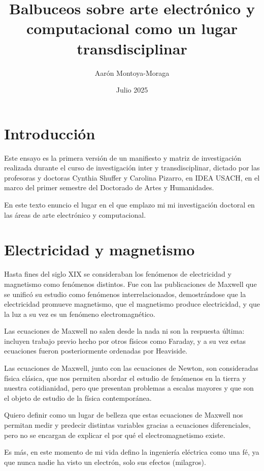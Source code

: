 \documentclass{article}
\title{Balbuceos sobre arte electrónico y computacional como un lugar transdisciplinar}
\author{Aarón Montoya-Moraga}
\date{Julio 2025}
\begin{document}
\maketitle

\renewcommand*\contentsname{Tabla de contenidos}

\tableofcontents

\section{Introducción}

Este ensayo es la primera versión de un manifiesto y matriz de investigación realizada durante el curso de investigación inter y transdisciplinar, dictado por las profesoras y doctoras Cynthia Shuffer y Carolina Pizarro, en IDEA USACH, en el marco del primer semestre del Doctorado de Artes y Humanidades.

En este texto enuncio el lugar en el que emplazo mi mi investigación doctoral en las áreas de arte electrónico y computacional.

\section{Electricidad y magnetismo}

Hasta fines del siglo XIX se consideraban los fenómenos de electricidad y magnetismo como fenómenos distintos. Fue con las publicaciones de Maxwell que se unificó su estudio como fenómenos interrelacionados, demostrándose que la electricidad promueve magnetismo, que el magnetismo produce electricidad, y que la luz a su vez es un fenómeno electromagnético.

Las ecuaciones de Maxwell no salen desde la nada ni son la respuesta última: incluyen trabajo previo hecho por otros físicos como Faraday, y a su vez estas ecuaciones fueron posteriormente ordenadas por Heaviside.

Las ecuaciones de Maxwell, junto con las ecuaciones de Newton, son consideradas física clásica, que nos permiten abordar el estudio de fenómenos en la tierra y nuestra cotidianidad, pero que presentan problemas a escalas mayores y que son el objeto de estudio de la física contemporánea.

Quiero definir como un lugar de belleza que estas ecuaciones de Maxwell nos permitan medir y predecir distintas variables gracias a ecuaciones diferenciales, pero no se encargan de explicar el por qué el electromagnetismo existe.

Es más, en este momento de mi vida defino la ingeniería eléctrica como una fé, ya que nunca nadie ha visto un electrón, solo sus efectos (milagros).
\end{document}
